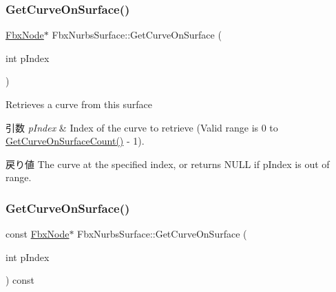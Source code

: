 \mbox{\label{class_fbx_nurbs_surface_adfb1c6483f23f8d8b27b157d02a2ccc0}} 
\subsubsection{\texorpdfstring{Get\+Curve\+On\+Surface()}{GetCurveOnSurface()}\hspace{0.1cm}{\footnotesize\ttfamily [1/2]}}
{\footnotesize\ttfamily \hyperlink{class_fbx_node}{Fbx\+Node}$\ast$ Fbx\+Nurbs\+Surface\+::\+Get\+Curve\+On\+Surface (\begin{DoxyParamCaption}\item[{int}]{p\+Index }\end{DoxyParamCaption})}

Retrieves a curve from this surface 
\begin{DoxyParams}{引数}
{\em p\+Index} & Index of the curve to retrieve (Valid range is 0 to \hyperlink{class_fbx_nurbs_surface_aeb1717a47a9bfe18ebe190d22507f3a7}{Get\+Curve\+On\+Surface\+Count()} -\/ 1). \\
\hline
\end{DoxyParams}
\begin{DoxyReturn}{戻り値}
The curve at the specified index, or returns N\+U\+LL if p\+Index is out of range. 
\end{DoxyReturn}
\mbox{\label{class_fbx_nurbs_surface_a9845d1c929ec30fbc8730ea10baa1b0e}} 
\subsubsection{\texorpdfstring{Get\+Curve\+On\+Surface()}{GetCurveOnSurface()}\hspace{0.1cm}{\footnotesize\ttfamily [2/2]}}
{\footnotesize\ttfamily const \hyperlink{class_fbx_node}{Fbx\+Node}$\ast$ Fbx\+Nurbs\+Surface\+::\+Get\+Curve\+On\+Surface (\begin{DoxyParamCaption}\item[{int}]{p\+Index }\end{DoxyParamCaption}) const}


